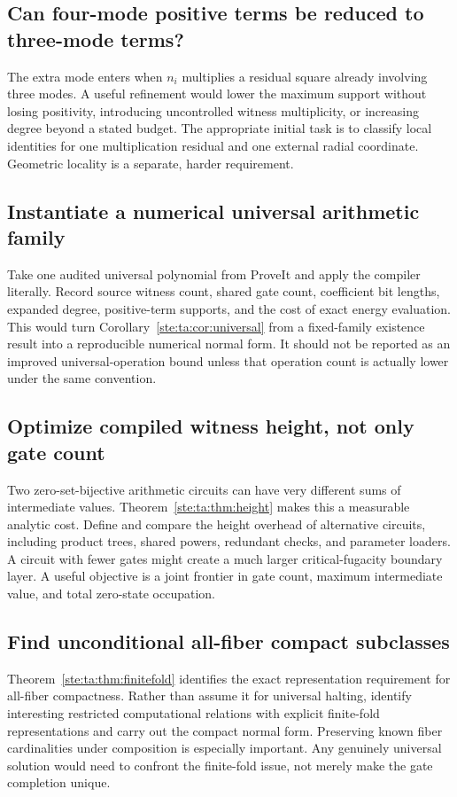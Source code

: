 \documentclass[11pt,letterpaper]{article}
\theoremstyle{definition}
\theoremstyle{remark}
\begin{document}
\subsection{Can four-mode positive terms be reduced to three-mode terms?}\label{ste:ta:q:threemode}
The extra mode enters when $n_i$ multiplies a residual square already involving three modes. A useful refinement would lower the maximum support without losing positivity, introducing uncontrolled witness multiplicity, or increasing degree beyond a stated budget. The appropriate initial task is to classify local identities for one multiplication residual and one external radial coordinate. Geometric locality is a separate, harder requirement.

\subsection{Instantiate a numerical universal arithmetic family}\label{ste:ta:q:instantiate}
Take one audited universal polynomial from ProveIt and apply the compiler literally. Record source witness count, shared gate count, coefficient bit lengths, expanded degree, positive-term supports, and the cost of exact energy evaluation. This would turn Corollary~\ref{ste:ta:cor:universal} from a fixed-family existence result into a reproducible numerical normal form. It should not be reported as an improved universal-operation bound unless that operation count is actually lower under the same convention.

\subsection{Optimize compiled witness height, not only gate count}\label{ste:ta:q:height}
Two zero-set-bijective arithmetic circuits can have very different sums of intermediate values. Theorem~\ref{ste:ta:thm:height} makes this a measurable analytic cost. Define and compare the height overhead of alternative circuits, including product trees, shared powers, redundant checks, and parameter loaders. A circuit with fewer gates might create a much larger critical-fugacity boundary layer. A useful objective is a joint frontier in gate count, maximum intermediate value, and total zero-state occupation.

\subsection{Find unconditional all-fiber compact subclasses}\label{ste:ta:q:compact}
Theorem~\ref{ste:ta:thm:finitefold} identifies the exact representation requirement for all-fiber compactness. Rather than assume it for universal halting, identify interesting restricted computational relations with explicit finite-fold representations and carry out the compact normal form. Preserving known fiber cardinalities under composition is especially important. Any genuinely universal solution would need to confront the finite-fold issue, not merely make the gate completion unique.
\end{document}
